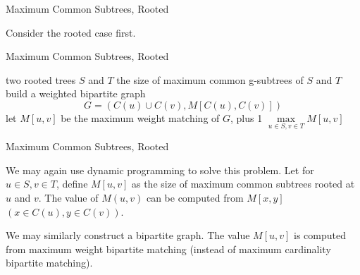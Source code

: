 \documentclass[handout]{beamer}
\begin{document}
\begin{frame}{Maximum Common Subtrees, Rooted}
\begin{figure}
\end{figure}

Consider the rooted case first.
\end{frame}

\begin{frame}{Maximum Common Subtrees, Rooted}
\begin{algorithm}[H] 
	\caption{Rooted Maximum Common Subtrees} 
	\begin{algorithmic}[1] 
		\Require two rooted trees $S$ and $T$
		\Ensure the size of maximum common g-subtrees of $S$ and $T$
		\State build a weighted bipartite graph 
		$$G = (C(u) \cup C(v), M[C(u), C(v)])$$
		\State let $M[u, v]$ be the maximum weight matching of $G$, plus 1
		\EndFor
		\EndFor
		\State \Return $\max\limits_{u \in S, v \in T} M[u, v]$
	\end{algorithmic} 
\end{algorithm}
\end{frame}

\begin{frame}{Maximum Common Subtrees, Rooted}
\begin{solution}
	We may again use dynamic programming to solve this problem. Let for $u \in S, v \in T$, define $M[u, v]$ as the size of maximum common subtrees rooted at $u$ and $v$. The value of $M(u, v)$ can be computed from $M[x, y]$ $(x \in C(u), y \in C(v))$.
\end{solution}

We may similarly construct a bipartite graph. The value $M[u, v]$ is computed from maximum weight bipartite matching (instead of maximum cardinality bipartite matching).

\end{frame}
\end{document}
